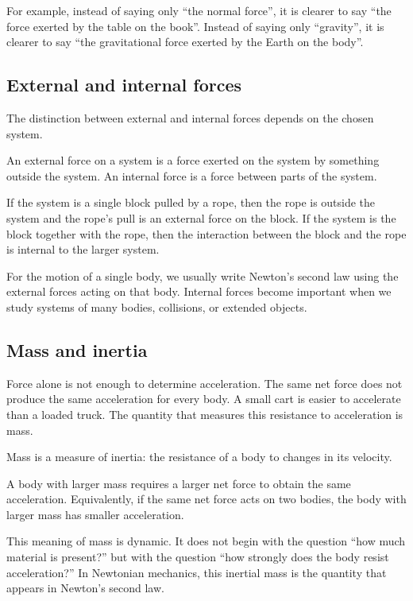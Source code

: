For example, instead of saying only ``the normal force'', it is clearer to say ``the force exerted by the table on the book''. Instead of saying only ``gravity'', it is clearer to say ``the gravitational force exerted by the Earth on the body''.

\subsection{External and internal forces}

The distinction between external and internal forces depends on the chosen system.

\begin{definitionbox}
An external force on a system is a force exerted on the system by something outside the system. An internal force is a force between parts of the system.
\end{definitionbox}

If the system is a single block pulled by a rope, then the rope is outside the system and the rope's pull is an external force on the block. If the system is the block together with the rope, then the interaction between the block and the rope is internal to the larger system.

For the motion of a single body, we usually write Newton's second law using the external forces acting on that body. Internal forces become important when we study systems of many bodies, collisions, or extended objects.

\subsection{Mass and inertia}

Force alone is not enough to determine acceleration. The same net force does not produce the same acceleration for every body. A small cart is easier to accelerate than a loaded truck. The quantity that measures this resistance to acceleration is mass.

\begin{definitionbox}
Mass is a measure of inertia: the resistance of a body to changes in its velocity.
\end{definitionbox}

A body with larger mass requires a larger net force to obtain the same acceleration. Equivalently, if the same net force acts on two bodies, the body with larger mass has smaller acceleration.

This meaning of mass is dynamic. It does not begin with the question ``how much material is present?'' but with the question ``how strongly does the body resist acceleration?'' In Newtonian mechanics, this inertial mass is the quantity that appears in Newton's second law.


